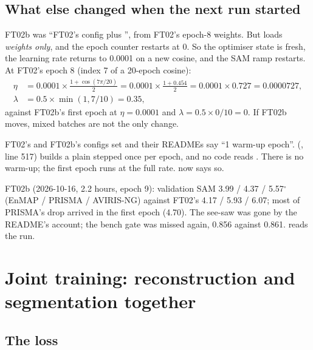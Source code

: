 \subsection{What else changed when the next run started}

FT02b was ``FT02's config plus '', from FT02's epoch-8 weights. But  loads \emph{weights only}, and the epoch
counter restarts at 0. So the optimiser state is fresh, the learning rate returns to 0.0001 on a new cosine, and the SAM ramp restarts. At FT02's epoch 8
(index 7 of a 20-epoch cosine):
\begin{align*}
  \eta &= 0.0001 \times \frac{1 + \cos(7\pi/20)}{2} = 0.0001 \times \frac{1 + 0.454}{2} = 0.0001 \times 0.727 = 0.0000727,\\
  \lambda &= 0.5 \times \min(1, 7/10) = 0.35,
\end{align*}
against FT02b's first epoch at $\eta = 0.0001$ and $\lambda = 0.5 \times 0/10 = 0$. If FT02b moves, mixed batches are not the only change.

\begin{sourcenote}
FT02's and FT02b's configs set  and their READMEs say ``1 warm-up epoch''. 
(, line 517) builds a plain  stepped once per epoch, and no code reads
. There is no warm-up; the first epoch runs at the full rate.  now says so.
\end{sourcenote}

\begin{drift}
FT02b (2026-10-16, 2.2 hours,  epoch 9): validation SAM 3.99 / 4.37 / 5.57$^\circ$ (EnMAP / PRISMA / AVIRIS-NG) against FT02's 4.17 / 5.93 /
6.07; most of PRISMA's drop arrived in the first epoch (4.70). The see-saw was gone by the README's account; the bench gate was missed again, 0.856
against 0.861.\tbrk{}  reads the run.
\end{drift}

\section{Joint training: reconstruction and segmentation together}\label{sec:finetune:joint}

\subsection{The loss}

